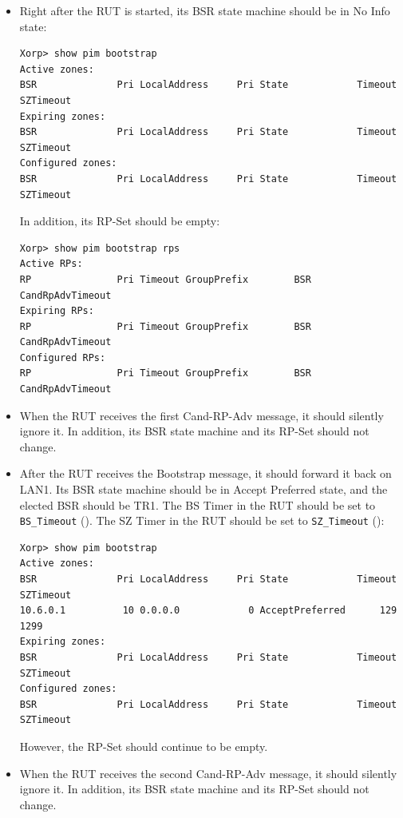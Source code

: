 \documentclass[11pt]{report}
\begin{document}
\begin{itemize}

  \item Right after the RUT is started, its BSR state machine should be in
  No Info state:

\begin{verbatim}
Xorp> show pim bootstrap 
Active zones:
BSR              Pri LocalAddress     Pri State            Timeout SZTimeout
Expiring zones:
BSR              Pri LocalAddress     Pri State            Timeout SZTimeout
Configured zones:
BSR              Pri LocalAddress     Pri State            Timeout SZTimeout
\end{verbatim}

  In addition, its RP-Set should be empty:

\begin{verbatim}
Xorp> show pim bootstrap rps 
Active RPs:
RP               Pri Timeout GroupPrefix        BSR         CandRpAdvTimeout
Expiring RPs:
RP               Pri Timeout GroupPrefix        BSR         CandRpAdvTimeout
Configured RPs:
RP               Pri Timeout GroupPrefix        BSR         CandRpAdvTimeout
\end{verbatim}

  \item When the RUT receives the first Cand-RP-Adv message, it should
  silently ignore it. In addition, its BSR state machine and its RP-Set should
  not change.

  \item After the RUT receives the Bootstrap message, it should forward it
        back on LAN1. Its BSR state machine
        should be in Accept Preferred state, and the elected BSR should be TR1.
        The BS Timer in the RUT should be set to \verb=BS_Timeout=
        ({\PimsmBSTimeout}).
        The SZ Timer in the RUT should be set to \verb=SZ_Timeout=
        ({\PimsmSZTimeout}):

\begin{verbatim}
Xorp> show pim bootstrap 
Active zones:
BSR              Pri LocalAddress     Pri State            Timeout SZTimeout
10.6.0.1          10 0.0.0.0            0 AcceptPreferred      129      1299
Expiring zones:
BSR              Pri LocalAddress     Pri State            Timeout SZTimeout
Configured zones:
BSR              Pri LocalAddress     Pri State            Timeout SZTimeout
\end{verbatim}

  However, the RP-Set should continue to be empty.

  \item When the RUT receives the second Cand-RP-Adv message, it should
  silently ignore it. In addition, its BSR state machine and its RP-Set should
  not change.

\end{itemize}
\end{document}
